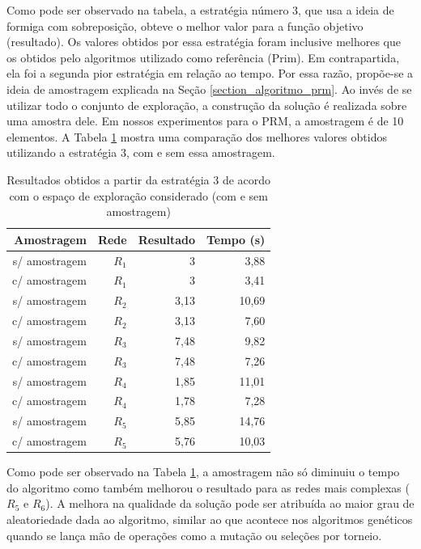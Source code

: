 Como pode ser observado na tabela, a estratégia número 3, que usa a ideia de formiga com sobreposição, obteve o melhor valor para a função objetivo (resultado). Os valores obtidos por essa estratégia foram inclusive melhores que os obtidos pelo algoritmos utilizado como referência (Prim). Em contrapartida, ela foi a segunda pior estratégia em relação ao tempo. Por essa razão, propõe-se a ideia de amostragem explicada na Seção \ref{section_algoritmo_prm}. Ao invés de se utilizar todo o conjunto de exploração, a construção da solução é realizada sobre uma amostra dele. Em nossos experimentos para o PRM, a amostragem é de 10 elementos. A Tabela \ref{tab_exp2_amostragem} mostra uma comparação dos melhores valores obtidos utilizando a estratégia 3, com e sem essa amostragem.

\begin{table}[!htbp]
	\centering
	\caption{Resultados obtidos a partir da estratégia 3 de acordo com o espaço de exploração considerado (com e sem amostragem)}
	\label{tab_exp2_amostragem}
	\begin{tabular}{rrrr}
		Amostragem    & Rede & Resultado   & Tempo (s) \\ \hline
		s/ amostragem & $R_1$    & 3 & 3,88      \\
		\rowcolor{table-green}
		c/ amostragem & $R_1$    & 3 & 3,41      \\ \hline
		s/ amostragem & $R_2$    & 3,13 & 10,69    \\
		\rowcolor{table-green}
		c/ amostragem & $R_2$    & 3,13 & 7,60     \\ \hline
		s/ amostragem & $R_3$    & 7,48 & 9,82     \\
		\rowcolor{table-green}
		c/ amostragem & $R_3$    & 7,48 & 7,26      \\ \hline
		s/ amostragem & $R_4$    & 1,85 & 11,01    \\
		\rowcolor{table-green}
		c/ amostragem & $R_4$    & 1,78 & 7,28      \\ \hline
		s/ amostragem & $R_5$    & 5,85 & 14,76    \\
		\rowcolor{table-green}
		c/ amostragem & $R_5$    & 5,76  & 10,03    \\ \hline
	\end{tabular}
\end{table}

Como pode ser observado na Tabela \ref{tab_exp2_amostragem}, a amostragem não só diminuiu o tempo do algoritmo como também melhorou o resultado para as redes mais complexas ($R_5$ e $R_6$). A melhora na qualidade da solução pode ser atribuída ao maior grau de aleatoriedade dada ao algoritmo, similar ao que acontece nos algoritmos genéticos quando se lança mão de operações como a mutação ou seleções por torneio.

